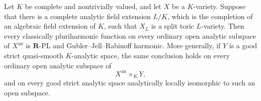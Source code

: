 
\begin{corollary}
\label{cor:p061-algebraic-split-toric-forms}
Let \(K\) be complete and nontrivially valued, and let \(X\) be a
\(K\)-variety.  Suppose that there is a complete analytic field extension
\(L/K\), which is the completion of an algebraic field extension of \(K\),
such that \(X_L\) is a split toric \(L\)-variety.  Then every classically
pluriharmonic function on every ordinary open analytic subspace of
\(X^{\mathrm{an}}\) is \(\mathbf R\)-PL and
Gubler--Jell--Rabinoff harmonic.  More generally, if \(Y\) is a good
strict quasi-smooth \(K\)-analytic space, the same conclusion holds on every
ordinary open analytic subspace of
\[
 X^{\mathrm{an}}\times_KY,
\]
and on every good strict analytic space analytically locally isomorphic to
such an open subspace.
\end{corollary}
